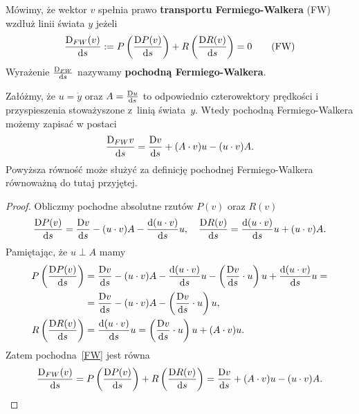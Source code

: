 \begin{definition}Mówimy, że wektor $v$ spełnia prawo \textbf{transportu 
Fermiego-Walkera} (FW) wzdłuż linii świata $y$ jeżeli
\begin{align} 
\frac{\text{D}_{FW} (v)}{\text{d} s}  :=  P \left(\frac{\text{D} P(v)}{\text{d} s} \right) +
R \left( \frac{\text{D} R(v)}{\text{d} s} \right) = 0
\tag{FW} \label{FW}
\end{align}
Wyrażenie $ \frac{{\text{D}}_{FW} }{\text{d} s}$ nazywamy \textbf{pochodną
Fermiego-Walkera}. 
\end{definition}
\begin{theorem}
Załóżmy, że $u = \dot{y}$ oraz $A=\frac{\text{D} u}{\text{d} s}$ 
to odpowiednio czterowektory
prędkości i przyspieszenia stoważyszone z~linią świata~$y$.
Wtedy pochodną Fermiego-Walkera możemy zapisać w postaci
\begin{align} 
\frac{\text{D}_{FW} v}{\text{d} s}   = 
\frac{\text{D} v}{\text{d} s} +
(A\cdot v) u - (u\cdot v) A.
\end{align}
Powyższa równość może służyć za definicję
pochodnej Fermiego-Walkera~\cite{synge1960} 
równoważną do tutaj przyjętej.
\end{theorem}
\begin{proof}
Obliczmy pochodne absolutne rzutów $P(v)$ oraz $R(v)$
\begin{align*}
\frac{\text{D} P(v)}{\text{d} s} = \frac{\text{D} v}{\text{d} s} - (u\cdot v) A  
- \frac{\text{d} (u \cdot v)}{\text{d} s} u, \quad
\frac{\text{D} R(v)}{\text{d} s} =\frac{\text{d} (u \cdot v)}{\text{d} s} u + (u\cdot v) A .
\end{align*}
Pamiętając, że $u \perp A$ mamy
\begin{align*}
P \left( \frac{\text{D} P(v)}{\text{d} s}  \right) 
&= \frac{\text{D} v}{\text{d} s} - (u\cdot v) A  
- \frac{\text{d} (u \cdot v)}{\text{d} s} u 
-\left(\frac{\text{D} v}{\text{d} s} \cdot u \right)u 
+ \frac{\text{d} (u \cdot v)}{\text{d} s} u =\\
&= \frac{\text{D} v}{\text{d} s} - (u\cdot v) A  
-\left(\frac{\text{D} v}{\text{d} s} \cdot u \right)u ,\\
R\left( \frac{\text{D} R(v)}{\text{d} s} \right) 
&=\frac{\text{d} (u \cdot v)}{\text{d} s} u  = 
\left(\frac{\text{D} v}{\text{d} s} \cdot u \right)u 
+ (A\cdot v)u .
\end{align*}
Zatem pochodna~\ref{FW} jest równa 
\begin{align} 
\frac{\text{D}_{FW} (v)}{\text{d} s} = P \left(\frac{\text{D} P(v)}{\text{d} s} \right) +
R \left( \frac{\text{D} R(v)}{\text{d} s} \right) = 
\frac{\text{D} v}{\text{d} s} +
(A\cdot v) u - (u\cdot v) A.
\end{align}
\end{proof}
